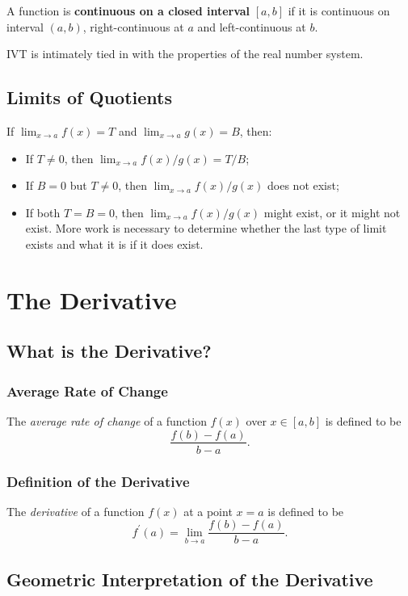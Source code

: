 \begin{definition}
  A function is \textbf{continuous on a closed interval} $\left[a,b\right]$ if it is continuous on interval $\left(a,b\right)$, right-continuous at $a$ and left-continuous at $b$.
\end{definition}
\begin{note}IVT is intimately tied in with the properties of the real number system.\end{note}


\section{Limits of Quotients}
If $\lim_{x\to a}f(x)=T$ and $\lim_{x\to a}g(x)=B$, then:
\begin{itemize}
\item If $T\neq0$, then $\lim_{x\to a}f(x)/g(x)=T/B$;
\item If $B=0$ but $T\neq0$, then $\lim_{x\to a}f(x)/g(x)$ does not exist;
\item If both $T=B=0$, then $\lim_{x\to a}f(x)/g(x)$ might exist, or it might not exist. More work is necessary to determine whether the last type of limit exists and what it is if it does exist.
\end{itemize}



\chapter{The Derivative}
\section{What is the Derivative?}
\subsection{Average Rate of Change}
The \textit{average rate of change} of a function $f(x)$ over $x\in\left[a,b\right]$ is defined to be
\[\frac{f(b)-f(a)}{b-a}.\]

\subsection{Definition of the Derivative}
The \textit{derivative} of a function $f(x)$ at a point $x=a$ is defined to be
\[f^\prime(a)=\lim_{b\to a}\frac{f(b)-f(a)}{b-a}.\]


\section{Geometric Interpretation of the Derivative}
